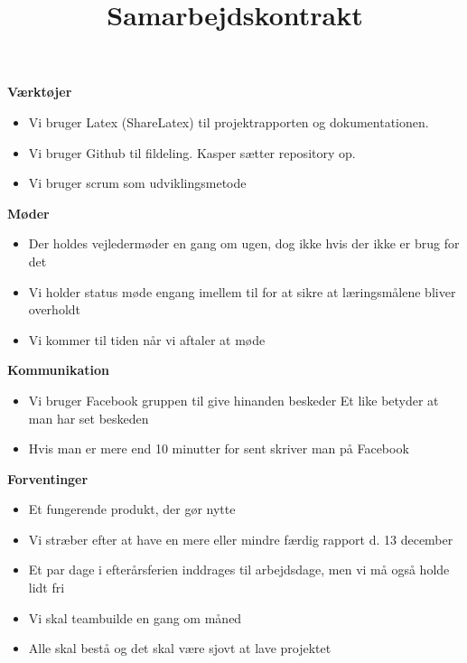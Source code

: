 \documentclass{article}
\begin{document}
	\title{Samarbejdskontrakt}
	\maketitle
	
	\textbf{Værktøjer}
	\begin{itemize}
		\item Vi bruger Latex (ShareLatex) til projektrapporten og dokumentationen. 
		\item Vi bruger Github til fildeling. Kasper sætter repository op.
		\item Vi bruger scrum som udviklingsmetode
	\end{itemize}
	
	
	\textbf{Møder}
	\begin{itemize}
		\item Der holdes vejledermøder en gang om ugen, dog ikke hvis der ikke er brug for det
		\item Vi holder status møde engang imellem til for at sikre at læringsmålene bliver overholdt
		\item Vi kommer til tiden når vi aftaler at møde
	\end{itemize}
		
		
	\textbf{Kommunikation}
	\begin{itemize}
		\item Vi bruger Facebook gruppen til give hinanden beskeder 
		\subitem Et like betyder at man har set beskeden 
		\item Hvis man er mere end 10 minutter for sent skriver man på Facebook
	\end{itemize}
	

			
	\textbf{Forventinger}
	\begin{itemize}
		\item Et fungerende produkt, der gør nytte
		\item Vi stræber efter at have en mere eller mindre færdig rapport d. 13 december
		\item Et par dage i efterårsferien inddrages til arbejdsdage, men vi må også holde lidt fri
		\item Vi skal teambuilde en gang om måned 
		\item Alle skal bestå og det skal være sjovt at lave projektet
	\end{itemize}
\end{document}
